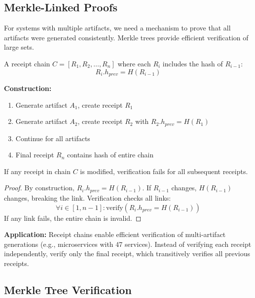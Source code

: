 \subsection{Merkle-Linked Proofs}

For systems with multiple artifacts, we need a mechanism to prove that all artifacts were generated consistently. Merkle trees provide efficient verification of large sets.

\begin{definition}
    A receipt chain \(C = [R_1, R_2, \ldots, R_n]\) where each \(R_i\) includes the hash of \(R_{i-1}\):
    \begin{equation}
        R_i.h_{prev} = H(R_{i-1})
    \end{equation}
\end{definition}

\textbf{Construction:}
\begin{enumerate}
    \item Generate artifact \(A_1\), create receipt \(R_1\)
    \item Generate artifact \(A_2\), create receipt \(R_2\) with \(R_2.h_{prev} = H(R_1)\)
    \item Continue for all artifacts
    \item Final receipt \(R_n\) contains hash of entire chain
\end{enumerate}

\begin{theorem}
    If any receipt in chain \(C\) is modified, verification fails for all subsequent receipts.
\end{theorem}

\begin{proof}
    By construction, \(R_i.h_{prev} = H(R_{i-1})\). If \(R_{i-1}\) changes, \(H(R_{i-1})\) changes, breaking the link. Verification checks all links:
    \begin{equation}
        \forall i \in [1, n-1]: \text{verify}(R_i.h_{prev} = H(R_{i-1}))
    \end{equation}
    If any link fails, the entire chain is invalid.
\end{proof}

\textbf{Application:} Receipt chains enable efficient verification of multi-artifact generations (e.g., microservices with 47 services). Instead of verifying each receipt independently, verify only the final receipt, which transitively verifies all previous receipts.

\subsection{Merkle Tree Verification}

